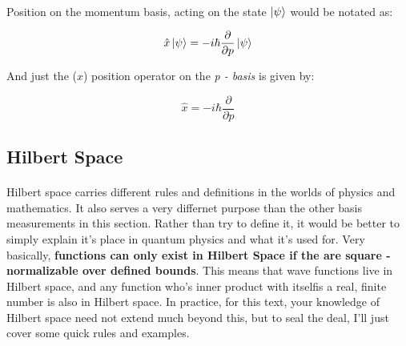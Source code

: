 \documentclass[12pt,letterpaper]{book}
\begin{document}
\paragraph*{}Position on the momentum basis, acting on the state $\ket{\psi}$ would be notated as:

\begin{equation}
\label{position on psi}
\hat{x}\ket{\psi} = -i\hbar\frac{\partial}{\partial p}\ket{\psi}
\end{equation}

And just the ($x$) position operator on the \textit{p - basis} is given by:

\begin{equation}
\label{position}
\hat{x} = -i\hbar\frac{\partial}{\partial p}
\end{equation}


\subsection*{Hilbert Space}

\paragraph*{}Hilbert space carries different rules and definitions in the worlds of physics and mathematics. It also serves a very differnet purpose than the other basis measurements in this section. Rather than try to define it, it would be better to simply explain it's place in quantum physics and what it's used for. Very basically, \textbf{functions can only exist in Hilbert Space if the  are square - normalizable over defined bounds}. This means that wave functions live in Hilbert space, and any function who's inner product with itselfis a real, finite number is also in Hilbert space. In practice, for this text, your knowledge of Hilbert space need not extend much beyond this, but to seal the deal, I'll just cover some quick rules and examples.
\end{document}
